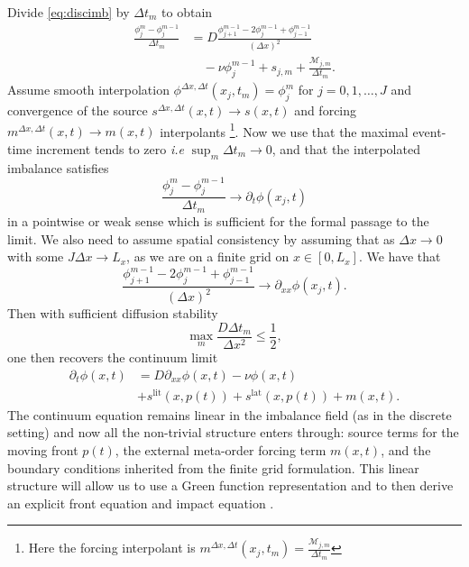 \documentclass[5p,final]{elsarticle}
\begin{document}
Divide \cref{eq:discimb} by $\Delta t_m$ to obtain
\begin{align}
\frac{\phi_j^m-\phi_j^{m-1}}{\Delta t_m}
&=
D\frac{\phi_{j+1}^{m-1}-2\phi_j^{m-1}+\phi_{j-1}^{m-1}}{(\Delta x)^2}
\nonumber \\
&\quad
- \nu\phi_j^{m-1}
+s_{j,m}
+ \frac{\mathcal M_{j,m}}{\Delta t_m}.
\end{align}
Assume smooth interpolation $\phi^{\Delta x,\Delta t}(x_j,t_m) = \phi_j^m$ for $j =0,1,\ldots,J$ and convergence of the source $s^{\Delta x,\Delta t}(x,t) \to s(x,t)$ and forcing $m^{\Delta x,\Delta t}(x,t) \to m(x,t)$ interpolants \footnote{Here the forcing interpolant is $m^{\Delta x,\Delta t}(x_j,t_m) = \frac{\mathcal M_{j,m}}{\Delta t_m}$}. Now we use that the maximal event-time increment tends to zero {\it i.e} $ \sup_{m} \Delta t_m \to 0$, and that the interpolated imbalance satisfies
\begin{equation}
    \frac{\phi_j^m-\phi_j^{m-1}}{\Delta t_m} \to \partial_t \phi(x_j,t)
\end{equation}
in a pointwise or weak sense which is sufficient for the formal passage to the limit. We also need to assume spatial consistency by assuming that as $\Delta x \to 0$ with some $J \Delta x \to L_x$, as we are on a finite grid on $x \in [0, L_x]$. We have that
\begin{equation}
    \frac{\phi_{j+1}^{m-1}-2\phi_j^{m-1}+\phi_{j-1}^{m-1}}{(\Delta x)^2} \to \partial_{xx} \phi(x_j,t).
\end{equation}
Then with sufficient diffusion stability
\begin{equation}
    \max_m \frac{D \Delta t_m}{\Delta x^2} \le \frac{1}{2},
\end{equation}
one then recovers the continuum limit 
 \begin{align}
    \partial_t\phi(x,t)
    &=D\partial_{xx}\phi(x,t)
    -\nu\phi(x,t) \nonumber \\
    \quad &
    +s^{\mathrm{lit}}(x,p(t))
    +s^{\mathrm{lat}}(x,p(t))
    +m(x,t).
\label{eq:pde}
\end{align}
The continuum equation remains linear in the imbalance field (as in the discrete setting) and now all the non-trivial structure enters through: source terms for the moving front $p(t)$, the external meta-order forcing term $m(x,t)$, and the boundary conditions inherited from the finite grid formulation. This linear structure will allow us to use a Green function representation and to then derive an explicit front equation and impact equation \cite{toth2011anomalous,donier2015fully,bouchaud2018tqp}.
\end{document}
